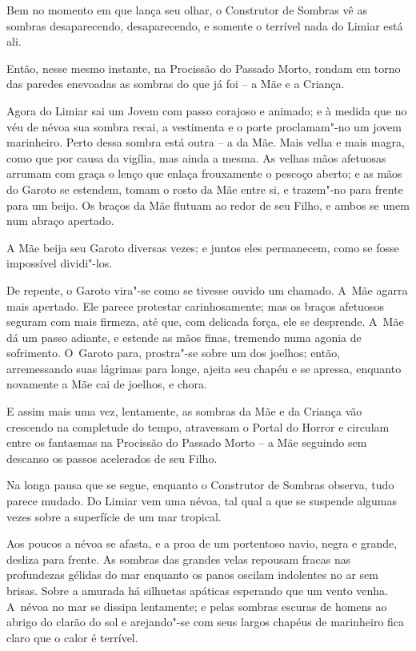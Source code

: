 Bem no momento em que lança seu olhar, o Construtor de Sombras vê as
sombras desaparecendo, desaparecendo, e somente o terrível nada do
Limiar está ali.

Então, nesse mesmo instante, na Procissão do Passado Morto, rondam em
torno das paredes enevoadas as sombras do que já foi -- a Mãe e a
Criança.

\smallskip
Agora do Limiar sai um Jovem com passo corajoso e animado; e à medida
que no véu de névoa sua sombra recai, a vestimenta e o porte
proclamam"-no um jovem marinheiro. Perto dessa sombra está outra -- a da
Mãe. Mais velha e mais magra, como que por causa da vigília, mas ainda a
mesma. As velhas mãos afetuosas arrumam com graça o lenço que enlaça
frouxamente o pescoço aberto; e as mãos do Garoto se estendem, tomam o
rosto da Mãe entre si, e trazem"-no para frente para um beijo. Os braços
da Mãe flutuam ao redor de seu Filho, e ambos se unem num abraço
apertado.

A Mãe beija seu Garoto diversas vezes; e juntos eles permanecem, como se
fosse impossível dividi"-los.

De repente, o Garoto vira"-se como se tivesse ouvido um chamado. A~Mãe
agarra mais apertado. Ele parece protestar carinhosamente; mas os braços
afetuosos seguram com mais firmeza, até que, com delicada força, ele se
desprende. A~Mãe dá um passo adiante, e estende as mãos finas, tremendo
numa agonia de sofrimento. O~Garoto para, prostra"-se sobre um dos
joelhos; então, arremessando suas lágrimas para longe, ajeita seu chapéu
e se apressa, enquanto novamente a Mãe cai de joelhos, e chora.

E assim mais uma vez, lentamente, as sombras da Mãe e da Criança vão
crescendo na completude do tempo, atravessam o Portal do Horror e
circulam entre os fantasmas na Procissão do Passado Morto -- a Mãe
seguindo sem descanso os passos acelerados de seu Filho.

\smallskip
Na longa pausa que se segue, enquanto o Construtor de Sombras observa,
tudo parece mudado. Do Limiar vem uma névoa, tal qual a que se suspende
algumas vezes sobre a superfície de um mar tropical.

Aos poucos a névoa se afasta, e a proa de um portentoso navio, negra e
grande, desliza para frente. As sombras das grandes velas repousam
fracas nas profundezas gélidas do mar enquanto os panos oscilam
indolentes no ar sem brisas. Sobre a amurada há silhuetas apáticas
esperando que um vento venha. A~névoa no mar se dissipa lentamente; e
pelas sombras escuras de homens ao abrigo do clarão do sol e arejando"-se
com seus largos chapéus de marinheiro fica claro que o calor é terrível.

